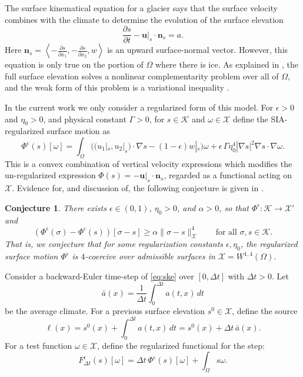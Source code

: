\documentclass[12pt]{article}
\newtheorem{conjecture}{Conjecture}
\newcommand{\bn}{\ensuremath{\mathbf{n}}}
\newcommand{\bu}{\ensuremath{\mathbf{u}}}
\newcommand{\cK}{\ensuremath{\mathcal{K}}}
\newcommand{\cX}{\ensuremath{\mathcal{X}}}
\newcommand{\grad}{\ensuremath{\nabla}}
\newcommand{\eps}{\ensuremath{\epsilon}}
\begin{document}
The surface kinematical equation \cite{GreveBlatter2009} for a glacier says that the surface velocity combines with the climate to determine the evolution of the surface elevation
\begin{equation}
\frac{\partial s}{\partial t} - \bu|_s \cdot \bn_s = a. \label{eq:ske}
\end{equation}
Here $\bn_s = \left<-\frac{\partial s}{\partial x_1},-\frac{\partial s}{\partial x_2},w\right>$ is an upward surface-normal vector.  However, this equation is only true on the portion of $\Omega$ where there is ice.  As explained in \cite{Bueler2025}, the full surface elevation solves a nonlinear complementarity problem over all of $\Omega$, and the weak form of this problem is a variational inequality \cite{KinderlehrerStampacchia1980}.

In the current work we only consider a regularized form of this model.  For $\eps>0$ and $\eta_0>0$, and physical constant $\Gamma>0$, for $s\in\cK$ and $\omega \in\cX$ define the SIA-regularized surface motion as
\begin{equation}
\Phi^\eps(s)[\omega] = \int_\Omega \Big(\big(u_1|_s,u_2|_s\big) \cdot \grad s - (1-\eps) w|_s\Big) \omega + \eps\, \Gamma \eta_0^4 |\grad s|^2 \grad s \cdot \grad \omega. \label{eq:defineregularizedPhi}
\end{equation}
This is a convex combination of vertical velocity expressions which modifies the un-regularized expression $\Phi(s)=-\bu|_s\cdot \bn_s$, regarded as a functional acting on $\cX$.  Evidence for, and discussion of, the following conjecture is given in \cite{Bueler2025}.

\begin{conjecture} \label{conj:regcoercive}  There exists $\eps \in (0,1)$, $\eta_0>0$, and $\alpha>0$, so that $\Phi^\eps:\cK \to \cX'$ and
\begin{equation}
\left(\Phi^\eps(\sigma) - \Phi^\eps(s)\right)[\sigma-s] \ge \alpha \|\sigma-s\|_{\cX}^4 \qquad \text{for all } \sigma,s\in\cK. \label{eq:regcoercive}
\end{equation}
That is, we conjecture that for some regularization constants $\eps,\eta_0$, the regularized surface motion $\Phi^\eps$ is $4$-coercive over admissible surfaces in $\cX=W^{1,4}(\Omega)$.
\end{conjecture}

Consider a backward-Euler time-step of \eqref{eq:ske} over $[0,\Delta t]$ with $\Delta t > 0$.  Let
\begin{equation}
\bar a(x) = \frac{1}{\Delta t} \int_{0}^{\Delta t} a(t,x)\,dt \label{eq:averagea}
\end{equation}
be the average climate.  For a previous surface elevation $s^0\in\cX$, define the source
\begin{equation}
\ell(x) = s^0(x) + \int_{0}^{\Delta t} a(t,x)\,dt = s^0(x) + \Delta t\, \bar a(x). \label{eq:source}
\end{equation}
For a test function $\omega\in\cX$, define the regularized functional for the step:
\begin{equation}
F^\eps_{\Delta t}(s)[\omega] = \Delta t\,\Phi^\eps(s)[\omega] + \int_\Omega s \omega. \label{eq:regularizedF}
\end{equation}
\end{document}
